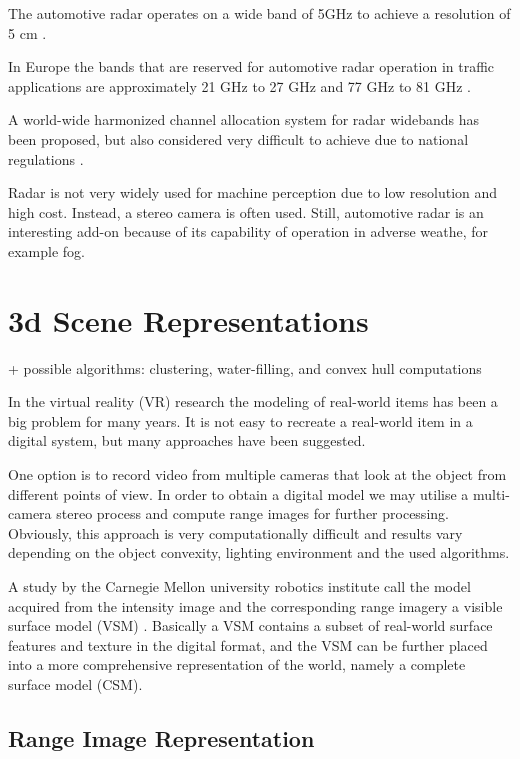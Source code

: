 \documentclass[12pt,a4paper,oneside,pdftex]{report}
\begin{document}
The automotive radar operates on a wide band of 5GHz to achieve a resolution of 5 cm \cite{Wenger07}.

In Europe the bands that are reserved for automotive radar operation in traffic applications are approximately 21 GHz to 27 GHz and 77 GHz to 81 GHz \cite{Wenger07}.

A world-wide harmonized channel allocation system for radar widebands has been proposed, but also considered very difficult to achieve due to national regulations \cite{Wenger07}.

Radar is not very widely used for machine perception due to low resolution and high cost. Instead, a stereo camera is often used. Still, automotive radar is an interesting add-on because of its capability of operation in adverse weathe, for example fog. 


\section{3d Scene Representations}
\label{section:3d_scene_representations}
+ possible algorithms: clustering, water-filling, and convex hull computations

In the virtual reality (VR) research the modeling of real-world items has been a big problem for many years. 
It is not easy to recreate a real-world item in a digital system, but many approaches have been suggested.

One option is to record video from multiple cameras that look at the object from different points of view. In order to obtain a digital model we may utilise a multi-camera stereo process and compute range images for further processing. Obviously, this approach is very computationally difficult and results vary depending on the object convexity, lighting environment and the used algorithms.  

A study by the Carnegie Mellon university robotics institute call the model acquired from the intensity image and the corresponding range imagery a visible surface model (VSM) \cite{Rander97}. Basically a VSM contains a subset of real-world surface features and texture in the digital format, and the VSM can be further placed into a more comprehensive representation of the world, namely a complete surface model (CSM). 

\subsection{Range Image Representation}
\label{subsection:range_image_representation}
\end{document}

